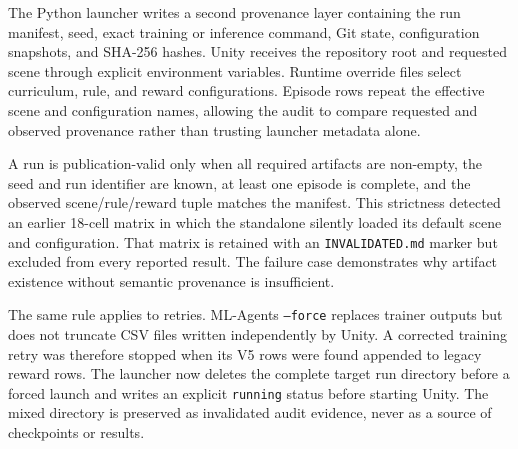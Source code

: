 \documentclass[journal]{IEEEtran}
\begin{document}
The Python launcher writes a second provenance layer containing the run manifest, seed, exact training or inference command, Git state, configuration snapshots, and SHA-256 hashes. Unity receives the repository root and requested scene through explicit environment variables. Runtime override files select curriculum, rule, and reward configurations. Episode rows repeat the effective scene and configuration names, allowing the audit to compare requested and observed provenance rather than trusting launcher metadata alone.

A run is publication-valid only when all required artifacts are non-empty, the seed and run identifier are known, at least one episode is complete, and the observed scene/rule/reward tuple matches the manifest. This strictness detected an earlier 18-cell matrix in which the standalone silently loaded its default scene and configuration. That matrix is retained with an \texttt{INVALIDATED.md} marker but excluded from every reported result. The failure case demonstrates why artifact existence without semantic provenance is insufficient.

The same rule applies to retries. ML-Agents \texttt{--force} replaces trainer outputs but does not truncate CSV files written independently by Unity. A corrected training retry was therefore stopped when its V5 rows were found appended to legacy reward rows. The launcher now deletes the complete target run directory before a forced launch and writes an explicit \texttt{running} status before starting Unity. The mixed directory is preserved as invalidated audit evidence, never as a source of checkpoints or results.
\end{document}
